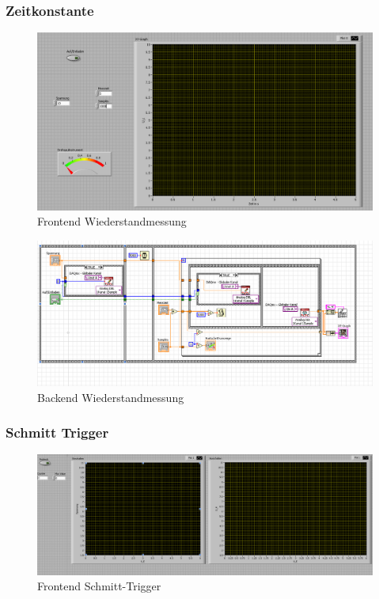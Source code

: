 \documentclass[12pt,twoside,a4paper]{scrartcl}
\begin{document}
		\subsubsection{Zeitkonstante}
			\label{Programme::Kondensator}

			\begin{figure}[H]
				\centering
				\includegraphics[width = 0.9 \textwidth]{Pictures/Programme/Frontend_Capacitor}
				\caption{Frontend Wiederstandmessung}
			\end{figure}

				\begin{figure}[H]
					\centering
					\includegraphics[width = 0.9 \textwidth]{Pictures/Programme/Backend_Capacitor}
					\caption{Backend Wiederstandmessung}
				\end{figure}

		\subsubsection{Schmitt Trigger}
			\label{Programme::Schmitt}
			\begin{figure}[H]
				\centering
				\includegraphics[width = 0.9 \textwidth]{Pictures/Programme/Frontend_Schmitt}
				\caption{Frontend Schmitt-Trigger}
			\end{figure}
\end{document}
